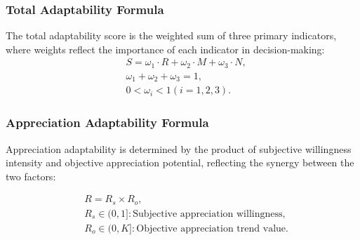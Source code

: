 \documentclass{mcmthesis}
\begin{document}
\subsubsection{ Total Adaptability Formula}
The total adaptability score is the weighted sum of three primary indicators, where weights reflect the importance of each indicator in decision-making:
\begin{equation}
\begin{aligned}
    &S = \omega_1 \cdot R + \omega_2 \cdot M + \omega_3 \cdot N, \\
    &\omega_1 + \omega_2 + \omega_3 = 1, \\
    &0 < \omega_i < 1  (i = 1,2,3).
\end{aligned}
\label{eq:total_adaptability}
\end{equation}

\subsubsection{ Appreciation Adaptability Formula}
Appreciation adaptability is determined by the product of subjective willingness intensity and objective appreciation potential, reflecting the synergy between the two factors:

\begin{equation}
\begin{aligned}
&R = R_s \times R_o, \\
&\text{} R_s \in (0,1]: \text{Subjective appreciation willingness}, \\
&\text{} R_o \in (0,K]: \text{Objective appreciation trend value}.
\end{aligned}
\label{eq:appreciation_adaptability}
\end{equation}


\end{document}

